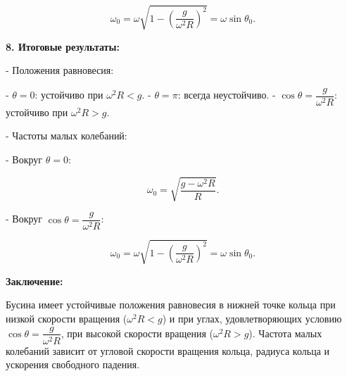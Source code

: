 \documentclass{article}
\begin{document}
\[
\omega_0 = \omega \sqrt{ 1 - \left( \dfrac{g}{\omega^2 R} \right )^2 } = \omega \sin \theta_0.
\]

\textbf{8. Итоговые результаты:}

- Положения равновесия:

  - \(\theta = 0\): устойчиво при \(\omega^2 R < g\).
  - \(\theta = \pi\): всегда неустойчиво.
  - \(\cos \theta = \dfrac{g}{\omega^2 R}\): устойчиво при \(\omega^2 R > g\).

- Частоты малых колебаний:

  - Вокруг \(\theta = 0\):

    \[
    \omega_0 = \sqrt{ \dfrac{g - \omega^2 R}{R} }.
    \]

  - Вокруг \(\cos \theta = \dfrac{g}{\omega^2 R}\):

    \[
    \omega_0 = \omega \sqrt{ 1 - \left( \dfrac{g}{\omega^2 R} \right )^2 } = \omega \sin \theta_0.
    \]

\textbf{Заключение:}

Бусина имеет устойчивые положения равновесия в нижней точке кольца при низкой скорости вращения (\(\omega^2 R < g\)) и при углах, удовлетворяющих условию \(\cos \theta = \dfrac{g}{\omega^2 R}\), при высокой скорости вращения (\(\omega^2 R > g\)). Частота малых колебаний зависит от угловой скорости вращения кольца, радиуса кольца и ускорения свободного падения.
\end{document}
